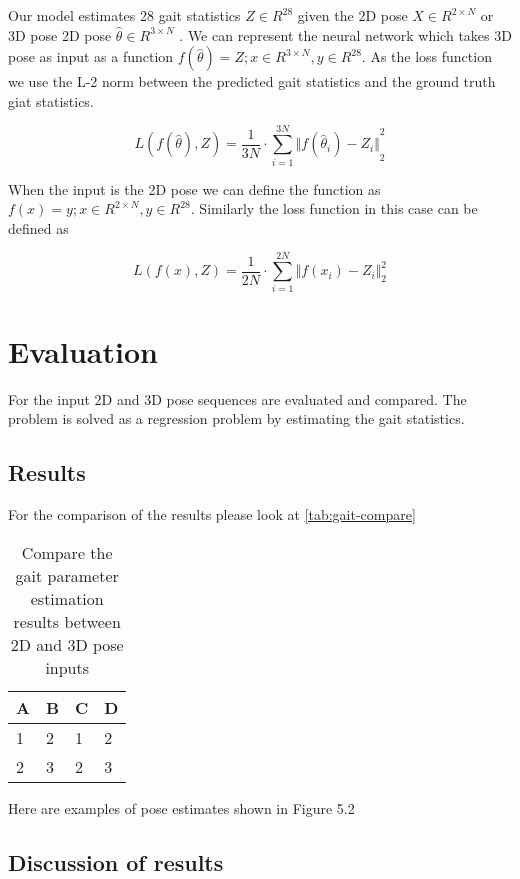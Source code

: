 Our model estimates 28 gait statistics $Z \in R^{28}$ given the 2D pose $X \in R^{2\times N}$ or 3D pose 2D pose $\hat{\theta} \in R^{3\times N}$ . We can represent the neural network which takes 3D pose as input as a function $f(\hat{\theta}) = Z ; x \in R^{3\times N}, y \in R^{28} $. As the loss function we use the L-2 norm between the predicted gait statistics and the ground truth giat statistics.

\begin{equation}	
    L(f(\hat{\theta}),Z) = \frac{1}{3N} \cdot \sum_{i=1}^{3N} {\Vert f(\hat{\theta}_i)-Z_i \Vert}_2^2
\end{equation}

When the input is the 2D pose we can define the function as  $f(x) = y ; x \in R^{2\times N}, y \in R^{28} $. Similarly the loss function in this case can be defined as

\begin{equation}	
    L(f(x),Z) = \frac{1}{2N} \cdot \sum_{i=1}^{2N} {\Vert f(x_i)-Z_i \Vert}_2^2
\end{equation}

\section{Evaluation}

For the input 2D and 3D pose sequences are evaluated and compared. The problem is solved as a regression problem by estimating the gait statistics.

\subsection{Results}

For the comparison of the results please look at \autoref{tab:gait-compare}

\begin{table}[htpb]
    \centering
    \begin{tabular}{l l l l}
        \toprule
            A & B & C & D \\
        \midrule
            1 & 2 & 1 & 2 \\
            2 & 3 & 2 & 3 \\
        \bottomrule
    \end{tabular}
    \caption[Comparison Gait]{Compare the gait parameter estimation results between 2D and 3D pose inputs}\label{tab:gait-compare}
\end{table}


Here are examples of pose estimates shown in Figure 5.2

\subsection{Discussion of results}


